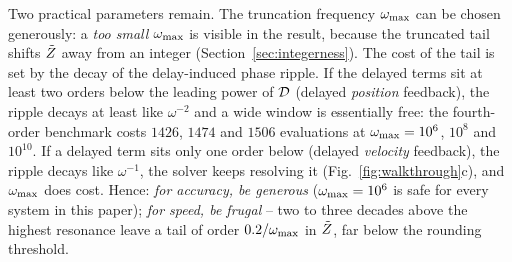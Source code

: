 Two practical parameters remain. The truncation frequency $\omega_{\mathrm{max}}$ can be
chosen generously: a \emph{too small} $\omega_{\mathrm{max}}$ is visible in the result,
because the truncated tail shifts $\tilde{Z}$ away from an integer
(Section~\ref{sec:integerness}). The cost of the tail is set by the decay of
the delay-induced phase ripple. If the delayed terms sit at least two orders
below the leading power of $\mathcal{D}$ (delayed \emph{position} feedback), the
ripple decays at least like $\omega^{-2}$ and a wide window is essentially
free: the fourth-order benchmark costs $1426$, $1474$ and $1506$ evaluations
at $\omega_{\mathrm{max}}=10^{6}$, $10^{8}$ and $10^{10}$. If a delayed term sits only one
order below (delayed \emph{velocity} feedback), the ripple decays like
$\omega^{-1}$, the solver keeps resolving it (Fig.~\ref{fig:walkthrough}c),
and $\omega_{\mathrm{max}}$ does cost. Hence: \emph{for accuracy, be generous}
($\omega_{\mathrm{max}}=10^{6}$ is safe for every system in this paper); \emph{for speed, be
frugal} -- two to three decades above the highest resonance leave a tail of
order $0.2/\omega_{\mathrm{max}}$ in $\tilde{Z}$, far below the rounding threshold.

